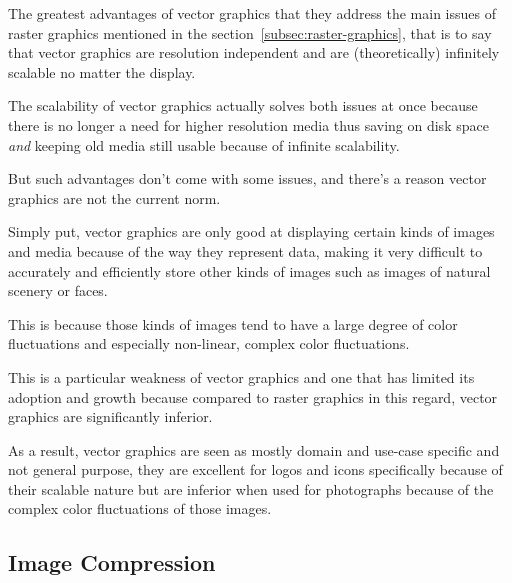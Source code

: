 \documentclass[12pt]{article}
\newcommand{\sentence}{} %
\newcommand{\italic}[1]{\textit{#1}}
\renewcommand{\fullref}[1]{\ref{#1}\nameref{#1}}
\begin{document}
    \bigskip
    The greatest advantages of vector graphics that they address the main issues of raster graphics mentioned in
    the section~\fullref{subsec:raster-graphics}, that is to say that vector graphics are resolution independent
    and are (theoretically) infinitely scalable no matter the display.
    \sentence
    The scalability of vector graphics actually solves both issues at once because there is no longer a need for
    higher resolution media thus saving on disk space \italic{and} keeping old media still usable because of infinite
    scalability.
    \sentence
    But such advantages don't come with some issues, and there's a reason vector graphics are not the current norm.
    \sentence
    Simply put, vector graphics are only good at displaying certain kinds of images and media because of the way they
    represent data, making it very difficult to accurately and efficiently store other kinds of images such as images
    of natural scenery or faces.
    \sentence
    This is because those kinds of images tend to have a large degree of color fluctuations and especially
    non-linear, complex color fluctuations.
    \sentence
    This is a particular weakness of vector graphics and one that has limited its adoption and growth because
    compared to raster graphics in this regard, vector graphics are significantly inferior.
    \sentence
    As a result, vector graphics are seen as mostly domain and use-case specific and not general purpose, they are
    excellent for logos and icons specifically because of their scalable nature but are inferior when used for
    photographs because of the complex color fluctuations of those images.



    \subsection{Image Compression}\label{subsec:image-compression}
\end{document}
